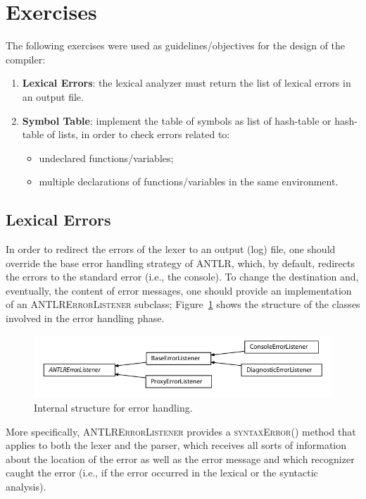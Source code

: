 \documentclass[11pt]{article} %
\begin{document}
\section{Exercises}
\label{sec:exercices}
The following exercises were used as guidelines/objectives for the design of the compiler:

\begin{enumerate}
\item \textbf{Lexical Errors}: the lexical analyzer must return the list of lexical errors in an output file. 
\item \textbf{Symbol Table}: implement the table of symbols as list of hash-table or hash-table of lists, in order to check errors related to:
\begin{itemize}
\item undeclared functions/variables;
\item multiple declarations of functions/variables in the same environment.
\end{itemize}
\end{enumerate}

\subsection{Lexical Errors}
In order to redirect the errors of the lexer to an output (log) file, one should override the base error handling strategy of ANTLR, which, by default, redirects the errors to the standard error (i.e., the console). To change the destination and, eventually, the content of error messages, one should provide an implementation of an \textsc{ANTLRErrorListener} subclass; Figure~\ref{fig:err} shows the structure of the classes involved in the error handling phase.
\begin{figure}
\includegraphics[width=\textwidth]{errorListener.png}
\caption{Internal structure for error handling\cite{reference}.}
\label{fig:err}
\end{figure}   
More specifically, \textsc{ANTLRErrorListener} provides a \textsc{syntaxError()} method that applies to both the lexer and the parser, which receives all sorts of information about the location of the error as well as the error message and which recognizer caught the error (i.e., if the error occurred in the lexical or the syntactic analysis).   
\end{document}
